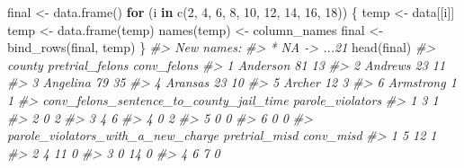 \documentclass[
]{krantz}
\makeatletter
\newenvironment{Shaded}{\begin{snugshade}}{\end{snugshade}}
\newcommand{\CommentTok}[1]{\textcolor[rgb]{0.37,0.37,0.37}{\textit{#1}}}
\newcommand{\ControlFlowTok}[1]{\textcolor[rgb]{0.27,0.27,0.27}{\textbf{#1}}}
\newcommand{\DecValTok}[1]{\textcolor[rgb]{0.06,0.06,0.06}{#1}}
\newcommand{\FunctionTok}[1]{\textcolor[rgb]{0,0,0}{#1}}
\newcommand{\NormalTok}[1]{#1}
\newcommand{\OtherTok}[1]{\textcolor[rgb]{0.37,0.37,0.37}{#1}}
\newenvironment{kframe}{%
\medskip{}
\setlength{\fboxsep}{.8em}
 \def\at@end@of@kframe{}%
 \ifinner\ifhmode%
  \def\at@end@of@kframe{\end{minipage}}%
  \begin{minipage}{\columnwidth}%
 \fi\fi%
 \def\FrameCommand##1{\hskip\@totalleftmargin \hskip-\fboxsep
 \colorbox{shadecolor}{##1}\hskip-\fboxsep
     \hskip-\linewidth \hskip-\@totalleftmargin \hskip\columnwidth}%
 \MakeFramed {\advance\hsize-\width
   \@totalleftmargin\z@ \linewidth\hsize
   \@setminipage}}%
 {\par\unskip\endMakeFramed%
 \at@end@of@kframe}
\renewenvironment{Shaded}{\begin{kframe}}{\end{kframe}}
\makeatother
\begin{document}
\begin{Shaded}
\begin{Highlighting}[]
\NormalTok{final }\OtherTok{\textless{}{-}} \FunctionTok{data.frame}\NormalTok{()}
\ControlFlowTok{for}\NormalTok{ (i }\ControlFlowTok{in} \FunctionTok{c}\NormalTok{(}\DecValTok{2}\NormalTok{, }\DecValTok{4}\NormalTok{, }\DecValTok{6}\NormalTok{, }\DecValTok{8}\NormalTok{, }\DecValTok{10}\NormalTok{, }\DecValTok{12}\NormalTok{, }\DecValTok{14}\NormalTok{, }\DecValTok{16}\NormalTok{, }\DecValTok{18}\NormalTok{)) \{}
\NormalTok{  temp        }\OtherTok{\textless{}{-}}\NormalTok{ data[[i]]}
\NormalTok{  temp        }\OtherTok{\textless{}{-}} \FunctionTok{data.frame}\NormalTok{(temp)}
  \FunctionTok{names}\NormalTok{(temp) }\OtherTok{\textless{}{-}}\NormalTok{ column\_names}
\NormalTok{  final       }\OtherTok{\textless{}{-}} \FunctionTok{bind\_rows}\NormalTok{(final, temp)}
\NormalTok{\}}
\CommentTok{\#\textgreater{} New names:}
\CommentTok{\#\textgreater{} * NA {-}\textgreater{} ...21}
\FunctionTok{head}\NormalTok{(final)}
\CommentTok{\#\textgreater{}      county pretrial\_felons conv\_felons}
\CommentTok{\#\textgreater{} 1  Anderson              81          13}
\CommentTok{\#\textgreater{} 2   Andrews              23          11}
\CommentTok{\#\textgreater{} 3  Angelina              79          35}
\CommentTok{\#\textgreater{} 4   Aransas              23          10}
\CommentTok{\#\textgreater{} 5    Archer              12           3}
\CommentTok{\#\textgreater{} 6 Armstrong               1           1}
\CommentTok{\#\textgreater{}   conv\_felons\_sentence\_to\_county\_jail\_time parole\_violators}
\CommentTok{\#\textgreater{} 1                                        3                1}
\CommentTok{\#\textgreater{} 2                                        0                2}
\CommentTok{\#\textgreater{} 3                                        4                6}
\CommentTok{\#\textgreater{} 4                                        0                2}
\CommentTok{\#\textgreater{} 5                                        0                0}
\CommentTok{\#\textgreater{} 6                                        0                0}
\CommentTok{\#\textgreater{}   parole\_violators\_with\_a\_new\_charge pretrial\_misd conv\_misd}
\CommentTok{\#\textgreater{} 1                                  5            12         1}
\CommentTok{\#\textgreater{} 2                                  4            11         0}
\CommentTok{\#\textgreater{} 3                                  0            14         0}
\CommentTok{\#\textgreater{} 4                                  6             7         0}

\end{Highlighting}
\end{Shaded}
\end{document}
